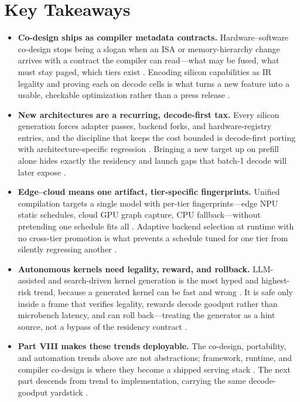 \section{Key Takeaways}
\label{sec:ch27_key_takeaways}

\begin{itemize}
\item \textbf{Co-design ships as compiler metadata contracts.}
Hardware--software co-design stops being a slogan when an ISA or memory-hierarchy change arrives with a contract the compiler can read---what may be fused, what must stay paged, which tiers exist \citep{yirage2026,semianalysis2024tma}. Encoding silicon capabilities as IR legality and proving each on decode cells is what turns a new feature into a usable, checkable optimization rather than a press release \citep{chen2020compilerbasedhardw,patel2025llminference}.

\item \textbf{New architectures are a recurring, decode-first tax.}
Every silicon generation forces adapter passes, backend forks, and hardware-registry entries, and the discipline that keeps the cost bounded is decode-first porting with architecture-specific regression \citep{chen2020compilerbasedhardw,yirage2026}. Bringing a new target up on prefill alone hides exactly the residency and launch gaps that batch-1 decode will later expose \citep{memoryfloor2026,taxbreak2026}.

\item \textbf{Edge--cloud means one artifact, tier-specific fingerprints.}
Unified compilation targets a single model with per-tier fingerprints---edge NPU static schedules, cloud GPU graph capture, CPU fallback---without pretending one schedule fits all \citep{amd2024xdna,amd2024aie}. Adaptive backend selection at runtime with no cross-tier promotion is what prevents a schedule tuned for one tier from silently regressing another \citep{patel2025llminference,kwon2023vllm}.

\item \textbf{Autonomous kernels need legality, reward, and rollback.}
LLM-assisted and search-driven kernel generation is the most hyped and highest-risk trend, because a generated kernel can be fast and wrong \citep{chen2020compilerbasedhardw,yirage2026}. It is safe only inside a frame that verifies legality, rewards decode goodput rather than microbench latency, and can roll back---treating the generator as a hint source, not a bypass of the residency contract \citep{memoryfloor2026,patel2025llminference}.

\item \textbf{Part VIII makes these trends deployable.}
The co-design, portability, and automation trends above are not abstractions; framework, runtime, and compiler co-design is where they become a shipped serving stack \citep{yirage2026,kwon2023vllm}. The next part descends from trend to implementation, carrying the same decode-goodput yardstick \citep{patel2025llminference,taxbreak2026}.
\end{itemize}

